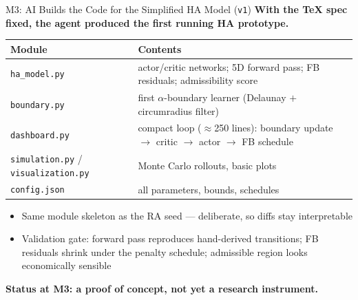 \documentclass[10pt,aspectratio=169]{beamer}
\newcommand{\compacttables}{\renewcommand{\arraystretch}{1.15}}
\begin{document}
\begin{frame}{M3: AI Builds the Code for the Simplified HA Model (\texttt{v1})}
\textbf{With the TeX spec fixed, the agent produced the first running HA prototype.}

\smallskip
\compacttables
\begin{center}\footnotesize
\begin{tabular}{p{3.0cm}p{8.9cm}}
\toprule
\textbf{Module} & \textbf{Contents} \\
\midrule
\texttt{ha\_model.py} & actor/critic networks; 5D forward pass; FB residuals; admissibility score \\
\texttt{boundary.py} & first $\alpha$-boundary learner (Delaunay $+$ circumradius filter) \\
\texttt{dashboard.py} & compact loop ($\approx$250 lines): boundary update $\to$ critic $\to$ actor $\to$ FB schedule \\
\texttt{simulation.py} / \texttt{visualization.py} & Monte Carlo rollouts, basic plots \\
\texttt{config.json} & all parameters, bounds, schedules \\
\bottomrule
\end{tabular}
\end{center}

\smallskip
\begin{itemize}\small
    \item Same module skeleton as the RA seed --- deliberate, so diffs stay interpretable
    \item Validation gate: forward pass reproduces hand-derived transitions; FB residuals
          shrink under the penalty schedule; admissible region looks economically sensible
\end{itemize}

\smallskip
\textbf{Status at M3: a proof of concept, not yet a research instrument.}
\end{frame}
\end{document}
